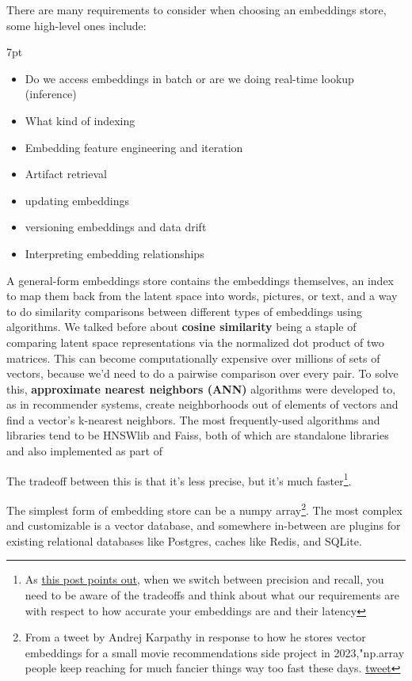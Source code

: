 \documentclass[11pt, table]{diazessay} %
\newenvironment{formal}{%
  \def\FrameCommand{%
	\hspace{1pt}%
	{\color{w_lightblue}\vrule width 2pt}%
	{\color{formalshade}\vrule width 4pt}%
	\colorbox{formalshade}%
  }%
  \MakeFramed{\advance\hsize-\width\FrameRestore}%
  \noindent\hspace{-4.55pt}%
  \begin{adjustwidth}{}{7pt}%
  \vspace{2pt}\vspace{2pt}%
}
{%
  \vspace{2pt}\end{adjustwidth}\endMakeFramed%
}
\begin{document}
\begin{sloppypar}
There are many requirements to consider when choosing an embeddings store, some high-level ones include:

\begin{formal}
\begin{itemize}
  \item Do we access embeddings in batch or are we doing real-time lookup (inference)
  \item What kind of indexing
  \item Embedding feature engineering and iteration
  \item Artifact retrieval
  \item updating embeddings
  \item versioning embeddings and data drift
  \item Interpreting embedding relationships
\end{itemize}
\end{formal}

A general-form embeddings store contains the embeddings themselves, an index to map them back from the latent space into words, pictures, or text, and a way to do similarity comparisons between different types of embeddings using algorithms. We talked before about \textbf{cosine similarity} being a staple of comparing latent space representations via the normalized dot product of two matrices. This can become computationally expensive over millions of sets of vectors, because we'd need to do a pairwise comparison over every pair. To solve this, \textbf{approximate nearest neighbors (ANN)} algorithms were developed to, as in recommender systems, create neighborhoods out of elements of vectors and find a vector's k-nearest neighbors. The most frequently-used algorithms and libraries tend to be HNSWlib and Faiss, both of which are standalone libraries and also implemented as part of

The tradeoff between this is that it's less precise, but it's much faster\footnote{As  \href{https://bergum.medium.com/four-mistakes-when-introducing-embeddings-and-vector-search-d39478a568c5}{this post points out}, when we switch between precision and recall, you need to be aware of the tradeoffs and think about what our requirements are with respect to how accurate your embeddings are and their latency}.

The simplest form of embedding store can be a numpy array\footnote{From a tweet by Andrej Karpathy in response to how he stores vector embeddings for a small movie recommendations side project in 2023,"np.array people keep reaching for much fancier things way too fast these days. \href{https://twitter.com/karpathy/status/1647374645316968449}{tweet}}. The most complex and customizable is a vector database, and somewhere in-between are plugins for existing relational databases like Postgres, caches like Redis, and SQLite.


\end{sloppypar}
\end{document}
